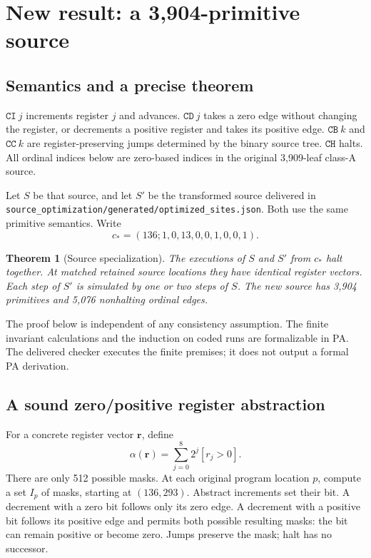 \documentclass[11pt,a4paper]{article}
\newtheorem{theorem}{Theorem}[section]
\theoremstyle{definition}
\newcommand{\CI}{\mathtt{CI}}
\newcommand{\CD}{\mathtt{CD}}
\newcommand{\CB}{\mathtt{CB}}
\newcommand{\CC}{\mathtt{CC}}
\newcommand{\CH}{\mathtt{CH}}
\newcommand{\file}[1]{\nolinkurl{#1}}
\begin{document}
\section{New result: a 3,904-primitive source}
\label{sec:newsource}

\subsection{Semantics and a precise theorem}

$\CI\ j$ increments register $j$ and advances. $\CD\ j$ takes a zero edge without changing the register, or decrements a positive register and takes its positive edge. $\CB\ k$ and $\CC\ k$ are register-preserving jumps determined by the binary source tree. $\CH$ halts. All ordinal indices below are zero-based indices in the original 3,909-leaf class-A source.

Let $S$ be that source, and let $S'$ be the transformed source delivered in \file{source_optimization/generated/optimized_sites.json}. Both use the same primitive semantics. Write
\[
c_*=(136;1,0,13,0,0,1,0,0,1).
\]

\begin{theorem}[Source specialization]
The executions of $S$ and $S'$ from $c_*$ halt together. At matched retained source locations they have identical register vectors. Each step of $S'$ is simulated by one or two steps of $S$. The new source has 3,904 primitives and 5,076 nonhalting ordinal edges.
\end{theorem}

The proof below is independent of any consistency assumption. The finite invariant calculations and the induction on coded runs are formalizable in PA. The delivered checker executes the finite premises; it does not output a formal PA derivation.

\subsection{A sound zero/positive register abstraction}

For a concrete register vector $\mathbf r$, define
\[
\alpha(\mathbf r)=\sum_{j=0}^{8}2^j[r_j>0].
\]
There are only 512 possible masks. At each original program location $p$, compute a set $I_p$ of masks, starting at $(136,293)$. Abstract increments set their bit. A decrement with a zero bit follows only its zero edge. A decrement with a positive bit follows its positive edge and permits both possible resulting masks: the bit can remain positive or become zero. Jumps preserve the mask; halt has no successor.
\end{document}
